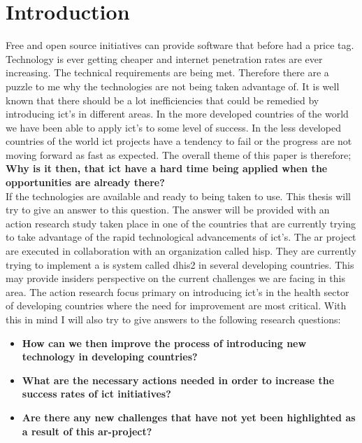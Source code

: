 \chapter{Introduction}

Free and open source initiatives can provide software that before had a price tag.
Technology is ever getting cheaper and internet penetration rates are ever increasing.
The technical requirements are being met. 
Therefore there are a puzzle to me why the technologies are not being taken advantage of.
It is well known that there should be a lot inefficiencies that could be remedied by introducing \gls{ict}'s in different areas.
In the more developed countries of the world we have been able to apply \gls{ict}'s to some level of success.
In the less developed countries of the world \gls{ict} projects have a tendency to fail or the progress are not moving forward as fast as expected.
The overall theme of this paper is therefore;\vspace{1cm}\\
\textbf{Why is it then, that \gls{ict} have a hard time being applied when the opportunities are already there?}\vspace{1cm}\\
If the technologies are available and ready to being taken to use. 
This thesis will try to give an answer to this question. 
\newpage
The answer will be provided with an action research study taken place in one of the countries that are currently trying to take advantage of the rapid technological advancements of \gls{ict}'s.
The \gls{ar} project are executed in collaboration with an organization called \gls{hisp}.
They are currently trying to implement a \gls{is} system called \gls{dhis2} in several developing countries.
This may provide insiders perspective on the current challenges we are facing in this area. 
The action research focus primary on introducing \gls{ict}'s in the health sector of developing countries where the need for improvement are most critical. 
With this in mind I will also try to give answers to the following research questions:
\begin{itemize}
\item \textbf{How can we then improve the process of introducing new technology in developing countries?}
\item \textbf{What are the necessary actions needed in order to increase the success rates of \gls{ict} initiatives?}
\item \textbf{Are there any new challenges that have not yet been highlighted as a result of this \gls{ar}-project?}
\end{itemize}
